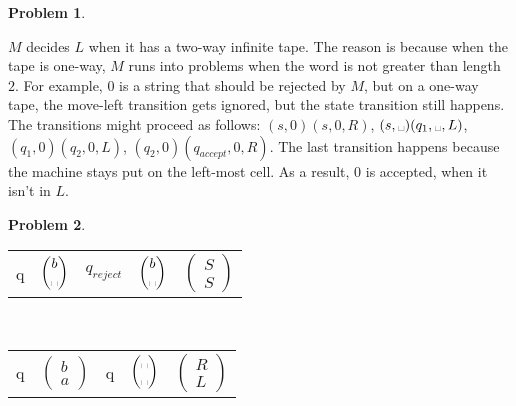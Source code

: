 \documentclass[11pt]{article}
\theoremstyle{definition}
\theoremstyle{case}
\theoremstyle{theorem}
\newtheorem{prob}{Problem}
\begin{document}
\begin{prob}\end{prob}

$M$ decides $L$ when it has a two-way infinite tape. The reason is because when
the tape is one-way, $M$ runs into problems when the word is not greater than length $2$.
For example, $0$ is a string that should be rejected by $M$, but on a one-way tape,
the move-left transition gets ignored, but the state transition still happens. The 
transitions might proceed as follows: $(s, 0) (s, 0, R)$, $(s, \text{\textvisiblespace}) (q_1, \text{\textvisiblespace}, L)$, 
$(q_1, 0) (q_2, 0, L)$, $(q_2, 0) (q_{accept}, 0, R)$. The last transition happens 
because the machine stays put on the left-most cell. As a result, $0$ is accepted,
when it isn't in $L$. 

\newpage

\begin{prob}\end{prob}

\begin{tabular}{l l l l l}
			q & 
			$\begin{pmatrix} b \\ \text{\textvisiblespace} \end{pmatrix}$ & 
			$q_{reject}$ & 
			$\begin{pmatrix} b \\ \text{\textvisiblespace} \end{pmatrix}$ & 
			$\begin{pmatrix} S \\ S \end{pmatrix}$
\end{tabular}\\

\vspace{10pt}

\begin{tabular}{l l l l l}
			q & 
			$\begin{pmatrix} b \\ a \end{pmatrix}$ & 
			q & 
			$\begin{pmatrix} \text{\textvisiblespace} \\ \text{\textvisiblespace} \end{pmatrix}$ & 
			$\begin{pmatrix} R \\ L \end{pmatrix}$
\end{tabular}\\
\end{document}
